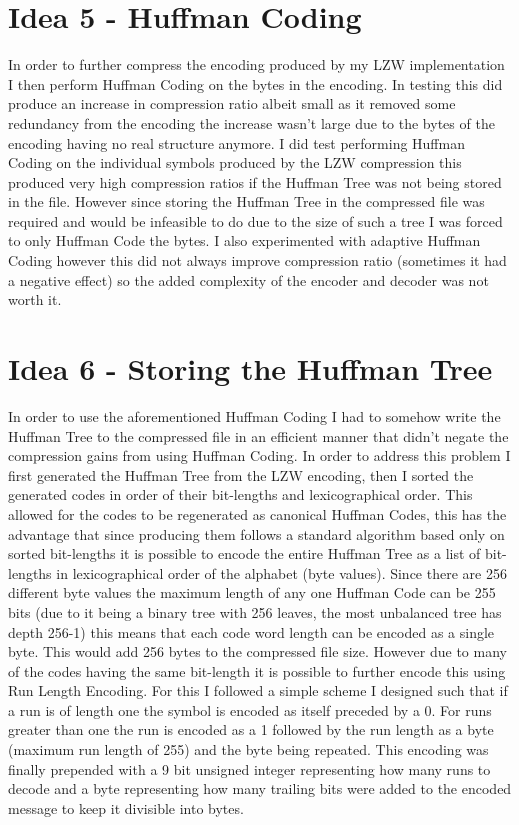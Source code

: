 \documentclass[11pt,a4paper]{article}
\begin{document}
\section*{Idea 5 - Huffman Coding}
In order to further compress the encoding produced by my LZW implementation I then perform Huffman Coding on the bytes in the encoding. In testing this did produce an increase in compression ratio albeit small as it removed some redundancy from the encoding the increase wasn't large due to the bytes of the encoding having no real structure anymore. I did test performing Huffman Coding on the individual symbols produced by the LZW compression this produced very high compression ratios if the Huffman Tree was not being stored in the file. However since storing the Huffman Tree in the compressed file was required and would be infeasible to do due to the size of such a tree I was forced to only Huffman Code the bytes. I also experimented with adaptive Huffman Coding however this did not always improve compression ratio (sometimes it had a negative effect) so the added complexity of the encoder and decoder was not worth it.
\section*{Idea 6 - Storing the Huffman Tree}
In order to use the aforementioned Huffman Coding I had to somehow write the Huffman Tree to the compressed file in an efficient manner that didn't negate the compression gains from using Huffman Coding. In order to address this problem I first generated the Huffman Tree from the LZW encoding, then I sorted the generated codes in order of their bit-lengths and lexicographical order. This allowed for the codes to be regenerated as canonical Huffman Codes, this has the advantage that since producing them follows a standard algorithm based only on sorted bit-lengths it is possible to encode the entire Huffman Tree as a list of bit-lengths in lexicographical order of the alphabet (byte values). Since there are 256 different byte values the maximum length of any one Huffman Code can be 255 bits (due to it being a binary tree with 256 leaves, the most unbalanced tree has depth 256-1) this means that each code word length can be encoded as a single byte. This would add 256 bytes to the compressed file size. However due to many of the codes having the same bit-length it is possible to further encode this using Run Length Encoding. For this I followed a simple scheme I designed such that if a run is of length one the symbol is encoded as itself preceded by a 0. For runs greater than one the run is encoded as a 1 followed by the run length as a byte (maximum run length of 255) and the byte being repeated. This encoding was finally prepended with a 9 bit unsigned integer representing how many runs to decode and a byte representing how many trailing bits were added to the encoded message to keep it divisible into bytes.
\end{document}
